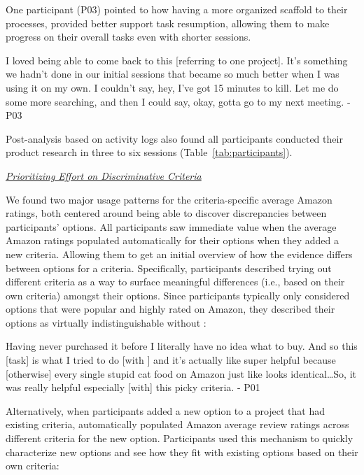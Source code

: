 One participant (P03) pointed to how having a more organized scaffold to their processes, \SYSTEM provided better support task resumption, allowing them to make progress on their overall tasks even with shorter sessions.

\begin{tightquote}

I loved being able to come back to this [referring to one project]. It's something we hadn't done in our initial sessions that became so much better when I was using it on my own. I couldn't say, hey, I've got 15 minutes to kill. Let me do some more searching, and then I could say, okay, gotta go to my next meeting. - P03

\end{tightquote}

Post-analysis based on activity logs also found all participants conducted their product research in three to six sessions (Table~\ref{tab:participants}).

\emph{\underline{Prioritizing Effort on Discriminative Criteria}}

We found two major usage patterns for the criteria-specific average Amazon ratings, both centered around being able to discover discrepancies between participants’ options.  All participants saw immediate value when the average Amazon ratings populated automatically for their options when they added a new criteria. Allowing them to get an initial overview of how the evidence differs between options for a criteria. Specifically, participants described trying out different criteria as a way to surface meaningful differences (i.e., based on their own criteria) amongst their options. Since participants typically only considered options that were popular and highly rated on Amazon, they described their options as virtually indistinguishable without \SYSTEM:

\begin{tightquote}
Having never purchased it before I literally have no idea what to buy. And so this [task] is what I tried to do [with \SYSTEM] and it's actually like super helpful because [otherwise] every single stupid cat food on Amazon just like looks identical…So, it was really helpful especially [with] this picky criteria. - P01

\end{tightquote}

Alternatively, when participants added a new option to a project that had existing criteria, \SYSTEM automatically populated Amazon average review ratings across different criteria for the new option. Participants used this mechanism to quickly characterize new options and see how they fit with existing options based on their own criteria:

